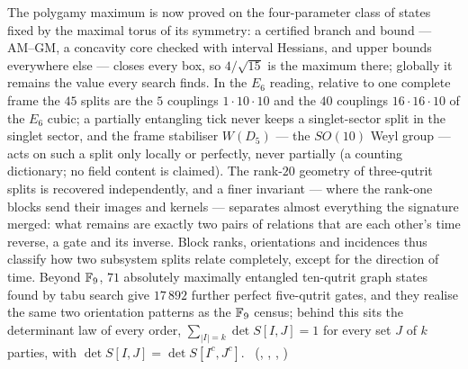The polygamy maximum is now proved on the four-parameter class of states fixed by the maximal torus of its symmetry: a
certified branch and bound --- AM--GM, a concavity core checked with interval Hessians, and upper bounds everywhere
else --- closes every box, so $4/\sqrt{15}$ is the maximum there; globally it remains the value every search finds.
In the $E_6$ reading, relative to one complete frame the $45$ splits are the $5$ couplings $1\cdot10\cdot10$ and the $40$
couplings $16\cdot16\cdot10$ of the $E_6$ cubic; a partially entangling tick never keeps a singlet-sector split in the
singlet sector, and the frame stabiliser $W(D_5)$ --- the $SO(10)$ Weyl group --- acts on such a split only locally or
perfectly, never partially (a counting dictionary; no field content is claimed). The rank-$20$ geometry of three-qutrit splits is recovered independently, and a finer invariant --- where the rank-one
blocks send their images and kernels --- separates almost everything the signature merged: what remains are exactly two
pairs of relations that are each other's time reverse, a gate and its inverse. Block ranks, orientations and incidences
thus classify how two subsystem splits relate completely, except for the direction of time. Beyond $\mathbb{F}_9$, $71$ absolutely maximally entangled ten-qutrit graph states found by tabu search give $17\,892$ further
perfect five-qutrit gates, and they realise the same two orientation patterns as the $\mathbb{F}_9$ census; behind this sits the
determinant law of every order, $\sum_{|I|=k}\det S[I,J]=1$ for every set $J$ of $k$ parties, with
$\det S[I,J]=\det S[I^c,J^c]$.
\tierC\ (, ,
, )

